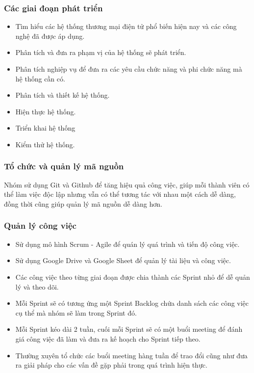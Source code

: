 \subsubsection{Các giai đoạn phát triển}
    \begin{itemize}
        \item Tìm hiểu các hệ thống thương mại điện tử phổ biến hiện nay và các công nghệ đã được áp dụng.
        \item Phân tích và đưa ra phạm vị của hệ thống sẽ phát triển.
        \item Phân tích nghiệp vụ để đưa ra các yêu cầu chức năng và phi chức năng mà hệ thống cần có.
        \item Phân tích và thiết kế hệ thống.
        \item Hiện thực hệ thống.
        \item Triển khai hệ thống
        \item Kiểm thử hệ thống.
    \end{itemize}
\subsubsection{Tổ chức và quản lý mã nguồn}
\noindent Nhóm sử dụng Git và Github để tăng hiệu quả công việc, giúp mỗi thành viên có thể làm việc độc lập nhưng vẫn có thể tương tác với nhau một cách dễ dàng, đồng thời cũng giúp quản lý mã nguồn dễ dàng hơn.
\subsubsection{Quản lý công việc}
\begin{itemize}
    \item Sử dụng mô hình Scrum - Agile để quán lý quá trình và tiến độ công việc.
    \item Sử dụng Google Drive và Google Sheet để quản lý tài liệu và công việc.
    \item Các công việc theo từng giai đoạn được chia thành các Sprint nhỏ để dễ quản lý và theo dõi.
    \item Mỗi Sprint sẽ có tương ứng một Sprint Backlog chứa danh sách các công việc cụ thể mà nhóm sẽ làm trong Sprint đó.
    \item Mỗi Sprint kéo dài 2 tuần, cuối mỗi Sprint sẽ có một buổi meeting để đánh giá công việc đã làm và đưa ra kế hoạch cho Sprint tiếp theo.
    \item Thường xuyên tổ chức các buổi meeting hàng tuần để trao đổi cũng như đưa ra giải pháp cho các
    vấn đề gặp phải trong quá trình hiện thực. 
\end{itemize}
